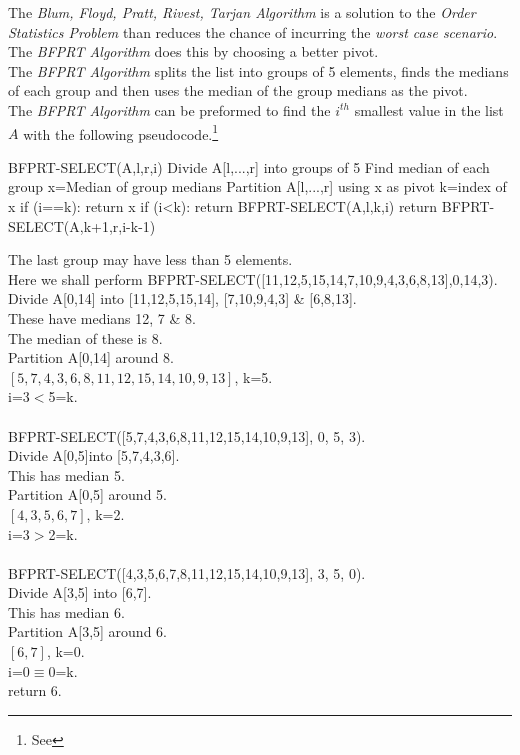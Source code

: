 \documentclass[11pt,a4paper]{article}
\begin{document}
The \textit{Blum, Floyd, Pratt, Rivest, Tarjan Algorithm} is a solution to the \textit{Order Statistics Problem} than reduces the chance of incurring the \textit{worst case scenario}.\\
The \textit{BFPRT Algorithm} does this by choosing a better pivot.\\
The \textit{BFPRT Algorithm} splits the list into groups of 5 elements, finds the medians of each group and then uses the median of the group medians as the pivot.\\
The \textit{BFPRT Algorithm} can be preformed to find the $i^{th}$ smallest value in the list $A$ with the following pseudocode.\footnote{See }
\begin{code}
BFPRT-SELECT(A,l,r,i)
Divide A[l,...,r] into groups of 5
Find median of each group
x=Median of group medians
Partition A[l,...,r] using x as pivot
k=index of x
if (i==k):
  return x
if (i<k):
  return BFPRT-SELECT(A,l,k,i)
return BFPRT-SELECT(A,k+1,r,i-k-1)
\end{code}
\nb The last group may have less than 5 elements.\\

\newpage
{}
Here we shall perform BFPRT-SELECT([11,12,5,15,14,7,10,9,4,3,6,8,13],0,14,3).\\
Divide A[0,14] into [11,12,5,15,14], [7,10,9,4,3] \& [6,8,13].\\
These have medians 12, 7 \& 8.\\
The median of these is 8.\\
Partition A[0,14] around 8.\\
$[5,7,4,3,6,8,11,12,15,14,10,9,13]$, k=5.\\
i=3$<$5=k.\\
\\
BFPRT-SELECT([5,7,4,3,6,8,11,12,15,14,10,9,13], 0, 5, 3).\\
Divide A[0,5]into [5,7,4,3,6].\\
This has median 5.\\
Partition A[0,5] around 5.\\
$[4,3,5,6,7]$, k=2.\\
i=3$>$2=k.\\
\\
BFPRT-SELECT([4,3,5,6,7,8,11,12,15,14,10,9,13], 3, 5, 0).\\
Divide A[3,5] into [6,7].\\
This has median 6.\\
Partition A[3,5] around 6.\\
$[6,7]$, k=0.\\
i=0$\equiv$0=k.\\
return 6.
\end{document}
